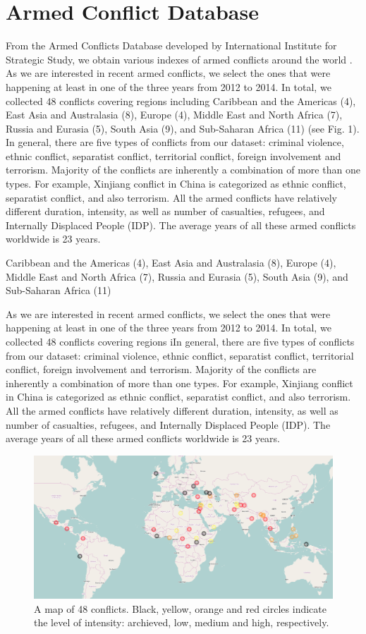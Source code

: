 \section{Armed Conflict Database}
From the Armed Conflicts Database developed by International Institute for Strategic Study, we obtain various indexes of armed conflicts around the world \cite{(conflictDB)}. As we are interested in recent armed conflicts, we select the ones that were happening at least in one of the three years from 2012 to 2014. In total, we collected 48 conflicts covering regions including Caribbean and the Americas (4), East Asia and Australasia (8), Europe (4), Middle East and North Africa (7), Russia and Eurasia (5), South Asia (9), and Sub-Saharan Africa (11) (see Fig. 1). In general, there are five types of conflicts from our dataset: criminal violence, ethnic conflict, separatist conflict, territorial conflict, foreign involvement and terrorism. Majority of the conflicts are inherently a combination of more than one types. For example, Xinjiang conflict in China is categorized as ethnic conflict, separatist conflict, and also terrorism. All the armed conflicts have relatively different duration, intensity, as well as number of casualties, refugees, and Internally Displaced People (IDP). The average years of all these armed conflicts worldwide is 23 years.

Caribbean and the Americas (4), East Asia and Australasia (8), Europe (4), Middle East and North Africa (7), Russia and Eurasia (5), South Asia (9), and Sub-Saharan Africa (11)

As we are interested in recent armed conflicts, we select the ones that were happening at least in one of the three years from 2012 to 2014. In total, we collected 48 conflicts covering regions iIn general, there are five types of conflicts from our dataset: criminal violence, ethnic conflict, separatist conflict, territorial conflict, foreign involvement and terrorism. Majority of the conflicts are inherently a combination of more than one types. For example, Xinjiang conflict in China is categorized as ethnic conflict, separatist conflict, and also terrorism. All the armed conflicts have relatively different duration, intensity, as well as number of casualties, refugees, and Internally Displaced People (IDP). The average years of all these armed conflicts worldwide is 23 years.

\begin{figure}
\centering
\includegraphics[width=0.9\columnwidth]{map.png}
\caption{A map of 48 conflicts. Black, yellow, orange and red circles indicate the level of intensity: archieved, low, medium and high, respectively.}
\label{rot}
\end{figure}


